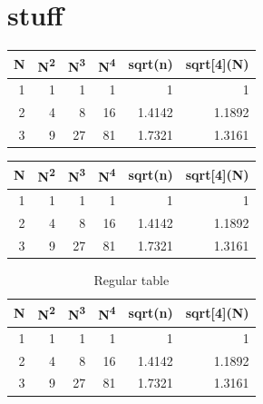 \documentclass[12pt]{extarticle}
\begin{document}
\section{stuff}
\label{sec:org47b493e}
\begin{minipage}{.5\textwidth}
\begin{center}
\begin{tabular}{|r|rrr|rr|}
\hline
N & N\textsuperscript{2} & N\textsuperscript{3} & N\textsuperscript{4} & sqrt(n) & sqrt[4](N)\\
\hline
1 & 1 & 1 & 1 & 1 & 1\\
2 & 4 & 8 & 16 & 1.4142 & 1.1892\\
3 & 9 & 27 & 81 & 1.7321 & 1.3161\\
\hline
\end{tabular}
\end{center}
\vspace*{-5mm}
\label{tbl:table1}
\end{minipage}
\begin{minipage}{.5\textwidth}
\begin{center}
\begin{tabular}{|r|rrr|rr|}
\hline
N & N\textsuperscript{2} & N\textsuperscript{3} & N\textsuperscript{4} & sqrt(n) & sqrt[4](N)\\
\hline
1 & 1 & 1 & 1 & 1 & 1\\
2 & 4 & 8 & 16 & 1.4142 & 1.1892\\
3 & 9 & 27 & 81 & 1.7321 & 1.3161\\
\hline
\end{tabular}
\end{center}
\vspace*{-5mm}
\label{tbl:table2}
\end{minipage}

\begin{table}[htbp]
\caption{\label{tbl:table3}Regular table}
\centering
\begin{tabular}{|r|rrr|rr|}
\hline
N & N\textsuperscript{2} & N\textsuperscript{3} & N\textsuperscript{4} & sqrt(n) & sqrt[4](N)\\
\hline
1 & 1 & 1 & 1 & 1 & 1\\
2 & 4 & 8 & 16 & 1.4142 & 1.1892\\
3 & 9 & 27 & 81 & 1.7321 & 1.3161\\
\hline
\end{tabular}
\end{table}
\end{document}
